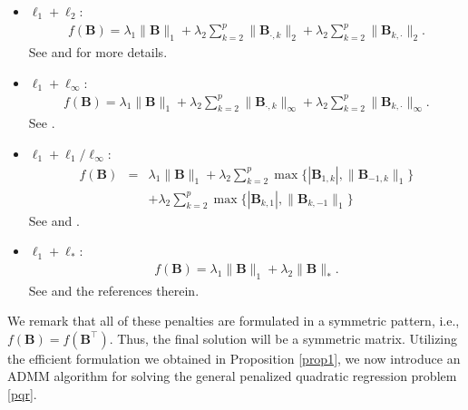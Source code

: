 \documentclass[preprint,authoryear,11pt]{elsarticle}
\newcommand{\B}{\mathbf B}
\newcommand{\trans}{^\top}
\begin{document}
\begin{itemize}
	\item $\ell_1+\ell_2$: 
\begin{align*}
	f(\B)=\lambda_1 \|\B\|_1+\lambda_2 \sum \limits_{k=2}^p \|\B_{\cdot,k}\|_2+\lambda_2 \sum \limits_{k=2}^p \|\B_{k,\cdot}\|_2.
\end{align*}
See \cite{radchenko2010variable} and \cite{lim2015learning} for more details. 
\item $\ell_1+\ell_\infty$:
\begin{align*}
	f(\B)=\lambda_1 \|\B\|_1+\lambda_2 \sum \limits_{k=2}^p \|\B_{\cdot,k}\|_\infty+\lambda_2 \sum \limits_{k=2}^p \|\B_{k,\cdot}\|_\infty.
\end{align*} 
See \cite{haris2016convex}.
\item $\ell_1+\ell_1/\ell_\infty$:
\begin{eqnarray*}
f(\B)&=&\lambda_1 \|\B\|_1+\lambda_2 \sum \limits_{k=2}^p \max\{|\B_{1,k}|, \|\B_{-1,k}\|_1\} \\
&&+\lambda_2 \sum \limits_{k=2}^p \max\{|\B_{k,1}|, \|\B_{k,-1}\|_1\}
\end{eqnarray*}
See \cite{bien2013lasso} and \cite{haris2016convex}.  
	\item $\ell_1+\ell_*$: 
\begin{align*}
	f(\B)=\lambda_1 \|\B\|_1+\lambda_2 \|\B\|_*.
\end{align*}	
See \cite{lu2021} and  the references therein. 
\end{itemize}  
We remark that all of these penalties are formulated in a symmetric pattern, i.e., $f(\B)=f(\B\trans)$. Thus, the final solution will be a symmetric matrix. 
Utilizing the efficient formulation we obtained in Proposition \ref{prop1}, we now introduce an ADMM algorithm for solving the general penalized quadratic regression problem \eqref{pqr}.

 
\end{document}
